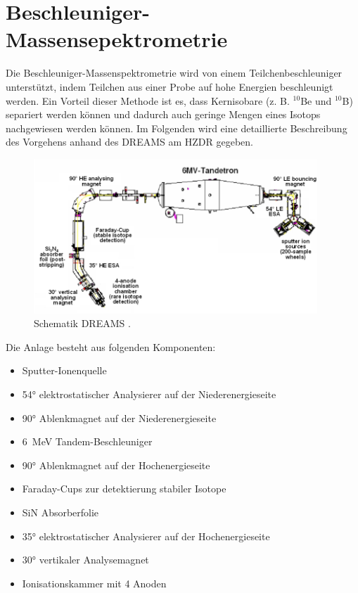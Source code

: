 \section{Beschleuniger-Massensepektrometrie}

Die Beschleuniger-Massenspektrometrie wird von einem Teilchenbeschleuniger unterstützt, indem Teilchen aus einer Probe auf hohe Energien beschleunigt werden.
Ein Vorteil dieser Methode ist es, dass Kernisobare (z. B. $^{10}$Be und $^{10}$B) separiert werden können und dadurch auch geringe Mengen eines Isotops nachgewiesen werden können.
Im Folgenden wird eine detaillierte Beschreibung des Vorgehens anhand des DREAMS am HZDR gegeben.
\begin{figure}[ht]
	\centering
    \includegraphics[width=0.95\textwidth]{Pictures/DREAMS.png}
	\caption{Schematik DREAMS \cite{Bild_DREAMS}.}
	\label{Theorie_Bild_DREAMS}
\end{figure}
Die Anlage besteht aus folgenden Komponenten:
\begin{itemize}
    \item Sputter-Ionenquelle
    \item \ang{54} elektrostatischer Analysierer auf der Niederenergieseite
    \item \ang{90} Ablenkmagnet auf der Niederenergieseite
    \item \SI{6}{\mega\electronvolt} Tandem-Beschleuniger
    \item \ang{90} Ablenkmagnet auf der Hochenergieseite
    \item Faraday-Cups zur detektierung stabiler Isotope
    \item SiN Absorberfolie
    \item \ang{35} elektrostatischer Analysierer auf der Hochenergieseite
    \item \ang{30} vertikaler Analysemagnet
    \item Ionisationskammer mit 4 Anoden
\end{itemize}
